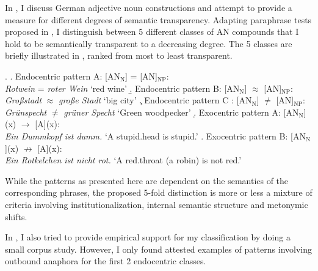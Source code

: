 In \citet{Schaefer:2011}, I discuss German adjective noun constructions and attempt to
provide a measure for different degrees of semantic
transparency. 
Adapting paraphrase tests proposed in
\citet{Fahim:1977}, I distinguish between 5 different
classes of AN compounds that I hold to be semantically transparent
to a decreasing degree. The 5 classes are briefly illustrated in
\Next, ranked from most to least transparent. 

\ex. \a. Endocentric pattern A: [AN$_{\text{N}}$] = [AN]$_{\text{NP}}$:\\
\emph{Rotwein} = \emph{roter Wein} `red wine'
\b. Endocentric pattern B: [AN$_{\text{N}}$] $\approx$ [AN]$_{\text{NP}}$:\\
\emph{Großstadt} $\approx$  \emph{große Stadt} `big city'
\c. Endocentric pattern C : [AN$_{\text{N}}$] $\not=$ [AN]$_{\text{NP}}$:\\
\emph{Grünspecht} $\not=$ \emph{grüner Specht} `Green woodpecker'
\d. Exocentric pattern A:  [AN$_{\text{N}}$](x) $\rightarrow$ [A](x):\\
\emph{Ein Dummkopf ist dumm.} `A stupid.head is stupid.'
\e. Exocentric pattern B: [AN$_{\text{N}}$](x) $\not\rightarrow$ [A](x):\\
\emph{Ein Rotkelchen ist nicht rot.} `A red.throat (a robin) is not red.'

While the patterns as presented here are dependent on the semantics of the
corresponding phrases, the proposed 5-fold distinction is more or
less a mixture of criteria involving institutionalization, internal
semantic structure and metonymic
shifts. %

In \citet{Schaefer:2011}, I also tried to provide empirical support for my
classification by doing a small corpus study. However, I only found
attested examples of patterns involving outbound anaphora
for the first 2 endocentric classes.


